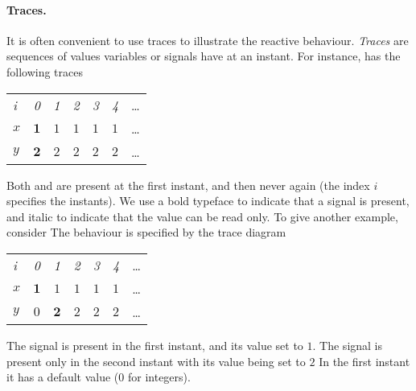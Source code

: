 \paragraph{Traces.}

It is often convenient to use traces to illustrate the reactive behaviour. \emph{Traces} are sequences of values variables or signals have at an instant. For instance,
% 
%
has the following traces
\begin{center}
  \leavevmode
  \begin{tabular}[]{l@{\quad}||@{\quad} cccccc}
    \hline\hline   
     \hbox{{\footnotesize \textit{i}}} &{\footnotesize \textit{0}}
     &{\footnotesize \textit{1}}&{\footnotesize \textit{2}}
     &{\footnotesize \textit{3}}&{\footnotesize \textit{4}}&\ldots
   \\  
    \hbox{$x$} &$\mathbf{1}$&$\mathit{1}$&$\mathit{1}$&$\mathit{1}$&
    $\mathit{1}$&\ldots
   \\
    \hbox{$y$} &$\mathbf{2}$&$\mathit{2}$&$\mathit{2}$&$\mathit{2}$&
    $\mathit{2}$&\ldots
   \\   \hline\hline
  \end{tabular}
\end{center}
Both  and  are present at the first instant, and then never 
again (the index $i$ specifies the instants). We use a bold typeface to
 indicate that a signal is present, and italic to indicate that the value can be read only. To give another example, consider
% 
%
The behaviour is specified by the 
trace diagram 
\begin{center}
  \leavevmode
  \begin{tabular}[]{l@{\quad}||@{\quad} cccccc}
    \hline\hline   
     \hbox{{\footnotesize \textit{i}}} &{\footnotesize \textit{0}}
     &{\footnotesize \textit{1}}&{\footnotesize \textit{2}}
     &{\footnotesize \textit{3}}&{\footnotesize \textit{4}}&\ldots
   \\  
   \hbox{$x$} &$\mathbf{1}$&$\mathit{1}$&$\mathit{1}$&
   $\mathit{1}$&$\mathit{1}$&\ldots
   \\
    \hbox{$y$} &$\mathit{0}$&$\mathbf{2}$&$\mathit{2}$&
    $\mathit{2}$&$\mathit{2}$&\ldots
   \\   \hline\hline
  \end{tabular}
\end{center}
The signal  is present in the first instant, and its value set to $1$.
The signal  is present only in the second instant with its value being set to $2$ In the first instant it has a default value ($0$ for integers).

